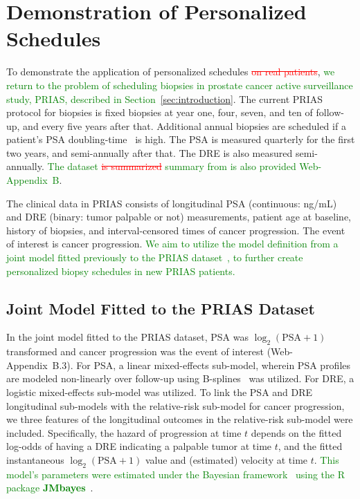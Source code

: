 \section{Demonstration of Personalized Schedules}
\label{sec:results}
To demonstrate the application of personalized schedules \textcolor{Red}{\st{on real patients}}, \textcolor{Green}{we return to the problem of scheduling biopsies in prostate cancer active surveillance study, PRIAS, described in Section~\ref{sec:introduction}}. The current PRIAS protocol for biopsies is fixed biopsies at year one, four, seven, and ten of follow-up, and every five years after that. Additional annual biopsies are scheduled if a patient's PSA doubling-time~\citep{bokhorst2015compliance} is high. The PSA is measured quarterly for the first two years, and semi-annually after that. The DRE is also measured semi-annually. \textcolor{Green}{The dataset} \textcolor{Red}{\st{is summarized}} \textcolor{Green}{summary from \citet{tomer2020webapp} is also provided Web-Appendix~B}.

The clinical data in PRIAS consists of longitudinal PSA (continuous: ng/mL) and DRE (binary: tumor palpable or not) measurements, patient age at baseline, history of biopsies, and interval-censored times of cancer progression. The event of interest is cancer progression. \textcolor{Green}{We aim to utilize the model definition from a joint model fitted previously to the PRIAS dataset~\citep{tomer2019personalized}, to further create personalized biopsy schedules in new PRIAS patients.}

\subsection{Joint Model Fitted to the PRIAS Dataset}
In the joint model fitted to the PRIAS dataset, PSA was $\log_2(\mbox{PSA} + 1)$ transformed and cancer progression was the event of interest (Web-Appendix~B.3). For PSA, a linear mixed-effects sub-model, wherein PSA profiles are modeled non-linearly over follow-up using B-splines~\citep{de1978practical} was utilized. For DRE, a logistic mixed-effects sub-model was utilized. To link the PSA and DRE longitudinal sub-models with the relative-risk sub-model for cancer progression, we three features of the longitudinal outcomes in the relative-risk sub-model were included. Specifically, the hazard of progression at time $t$ depends on the fitted log-odds of having a DRE indicating a palpable tumor at time $t$, and the fitted instantaneous $\log_2(\mbox{PSA} + 1)$ value and (estimated) velocity at time $t$.  \textcolor{Green}{This model's parameters were estimated under the Bayesian framework~\citep{tomer2019personalized} using the R package \textbf{JMbayes}~\citep{rizopoulosJMbayes}}. 

